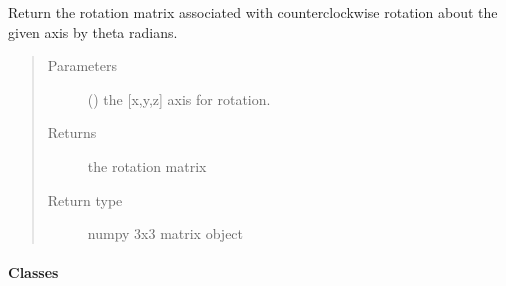 \documentclass[a4paper,10pt,english]{sphinxmanual}
\begin{document}
\begin{fulllineitems}
\label{\detokenize{reference/generated/paramagpy.protein.rotation_matrix:paramagpy.protein.rotation_matrix}}
Return the rotation matrix associated with counterclockwise
rotation about the given axis by theta radians.
\begin{quote}\begin{description}
\item[{Parameters}] \leavevmode
{} () \textendash{} the {[}x,y,z{]} axis for rotation.

\item[{Returns}] \leavevmode
{} \textendash{} the rotation matrix

\item[{Return type}] \leavevmode
numpy 3x3 matrix object

\end{description}\end{quote}

\end{fulllineitems}



\paragraph{Classes}
\label{\detokenize{reference/protein:classes}}
\end{document}
